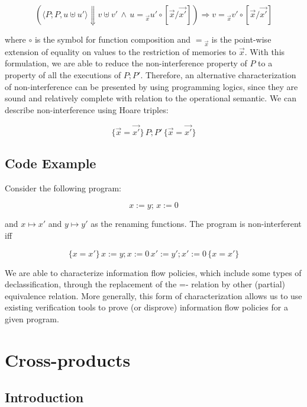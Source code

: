 \[ (\langle P; P, u \uplus u' \rangle \Downarrow v \uplus v' \, \land \, u = {}_{\overrightarrow{x}} u' \circ [\overrightarrow{x} / \overrightarrow{x'}]) \Rightarrow v = {}_{\overrightarrow{x}} v' \circ [\overrightarrow{x} / \overrightarrow{x'}] \]

where $\circ$ is the symbol for function composition and \(= {}_{\overrightarrow{x}}\) is the point-wise extension of equality on values to the restriction of memories to $\overrightarrow{x}$.
With this formulation, we are able to reduce the non-interference property of \(P\) to a property of all the executions of \(P; P'\).
Therefore, an alternative characterization of non-interference can be presented by using programming logics, since they are sound and relatively complete with relation to the operational semantic.
We can describe non-interference using Hoare triples:

\[ \{\overrightarrow{x} = \overrightarrow{x'}\} \, P; P' \, \{\overrightarrow{x} = \overrightarrow{x'}\} \]


\subsection{Code Example}
\label{subsec:self_composition_example}

Consider the following program:

\[ x := y; \, x := 0 \]

and \(x \mapsto x'\) and \(y \mapsto y'\) as the renaming functions. 
The program is non-interferent iff

\[ \{x = x'\} \, x := y; x := 0 \, x' := y'; x' := 0 \, \{x = x'\} \]

We are able to characterize information flow policies, which include some types of declassification, through the replacement of the =- relation by other (partial) equivalence relation.
More generally, this form of characterization allows us to use existing verification tools to prove (or disprove) information flow policies for a given program.


\FloatBarrier
\section{Cross-products} 
\label{sec:cross_products}

\subsection{Introduction} 
\label{subsec:cross_products_intro}

